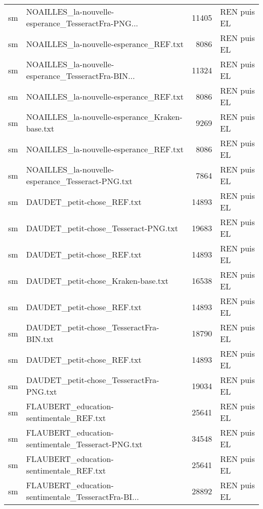 \begin{tabular}{llrl}
    sm & NOAILLES\_la-nouvelle-esperance\_TesseractFra-PNG... &                 11405 & REN puis EL \\
    sm &             NOAILLES\_la-nouvelle-esperance\_REF.txt &                  8086 & REN puis EL \\
    sm & NOAILLES\_la-nouvelle-esperance\_TesseractFra-BIN... &                 11324 & REN puis EL \\
    sm &             NOAILLES\_la-nouvelle-esperance\_REF.txt &                  8086 & REN puis EL \\
    sm &     NOAILLES\_la-nouvelle-esperance\_Kraken-base.txt &                  9269 & REN puis EL \\
    sm &             NOAILLES\_la-nouvelle-esperance\_REF.txt &                  8086 & REN puis EL \\
    sm &   NOAILLES\_la-nouvelle-esperance\_Tesseract-PNG.txt &                  7864 & REN puis EL \\
    sm &                         DAUDET\_petit-chose\_REF.txt &                 14893 & REN puis EL \\
    sm &               DAUDET\_petit-chose\_Tesseract-PNG.txt &                 19683 & REN puis EL \\
    sm &                         DAUDET\_petit-chose\_REF.txt &                 14893 & REN puis EL \\
    sm &                 DAUDET\_petit-chose\_Kraken-base.txt &                 16538 & REN puis EL \\
    sm &                         DAUDET\_petit-chose\_REF.txt &                 14893 & REN puis EL \\
    sm &            DAUDET\_petit-chose\_TesseractFra-BIN.txt &                 18790 & REN puis EL \\
    sm &                         DAUDET\_petit-chose\_REF.txt &                 14893 & REN puis EL \\
    sm &            DAUDET\_petit-chose\_TesseractFra-PNG.txt &                 19034 & REN puis EL \\
    sm &            FLAUBERT\_education-sentimentale\_REF.txt &                 25641 & REN puis EL \\
    sm &  FLAUBERT\_education-sentimentale\_Tesseract-PNG.txt &                 34548 & REN puis EL \\
    sm &            FLAUBERT\_education-sentimentale\_REF.txt &                 25641 & REN puis EL \\
    sm & FLAUBERT\_education-sentimentale\_TesseractFra-BI... &                 28892 & REN puis EL \\

\end{tabular}
